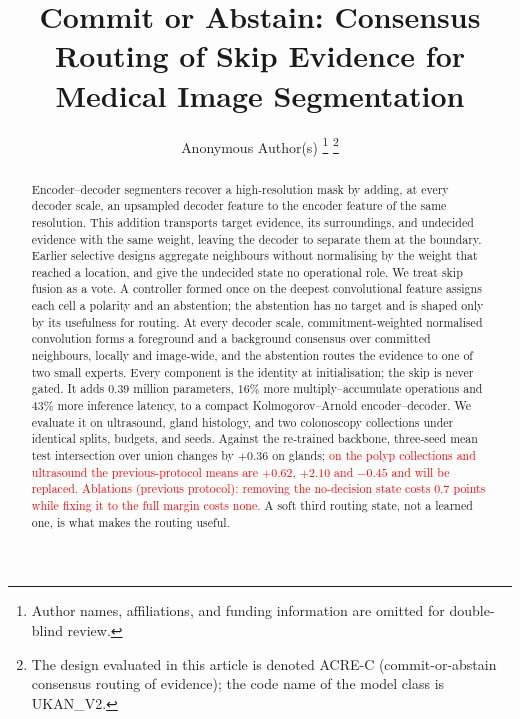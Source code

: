 \documentclass[journal,twoside,web]{ieeecolor}
\newcommand{\STALE}[1]{\textcolor{red}{#1}}
\begin{document}
\setlength{\floatsep}{8pt plus 2pt minus 2pt}
\setlength{\textfloatsep}{10pt plus 2pt minus 4pt}
\setlength{\abovecaptionskip}{6pt}

\title{Commit or Abstain: Consensus Routing of Skip Evidence for Medical Image Segmentation}

\author{Anonymous Author(s)
\thanks{Author names, affiliations, and funding information are omitted for double-blind review.}
\thanks{The design evaluated in this article is denoted ACRE-C (commit-or-abstain consensus routing of evidence); the code name of the model class is UKAN\_V2.}}

\maketitle

\begin{abstract}
Encoder--decoder segmenters recover a high-resolution mask by adding, at every decoder scale, an upsampled decoder feature to the encoder feature of the same resolution. This addition transports target evidence, its surroundings, and undecided evidence with the same weight, leaving the decoder to separate them at the boundary. Earlier selective designs aggregate neighbours without normalising by the weight that reached a location, and give the undecided state no operational role. We treat skip fusion as a vote. A controller formed once on the deepest convolutional feature assigns each cell a polarity and an abstention; the abstention has no target and is shaped only by its usefulness for routing. At every decoder scale, commitment-weighted normalised convolution forms a foreground and a background consensus over committed neighbours, locally and image-wide, and the abstention routes the evidence to one of two small experts. Every component is the identity at initialisation; the skip is never gated. It adds $0.39$ million parameters, $16\%$ more multiply--accumulate operations and $43\%$ more inference latency, to a compact Kolmogorov--Arnold encoder--decoder. We evaluate it on ultrasound, gland histology, and two colonoscopy collections under identical splits, budgets, and seeds. Against the re-trained backbone, three-seed mean test intersection over union changes by $+0.36$ on glands; \STALE{on the polyp collections and ultrasound the previous-protocol means are $+0.62$, $+2.10$ and $-0.45$ and will be replaced.} \STALE{Ablations (previous protocol): removing the no-decision state costs 0.7 points while fixing it to the full margin costs none.} A soft third routing state, not a learned one, is what makes the routing useful.
\end{abstract}
\end{document}
